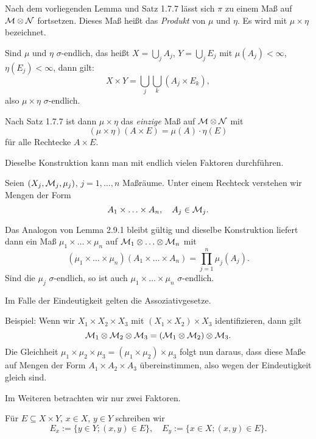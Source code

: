 \begin{defn}
 Nach dem vorliegenden Lemma und Satz 1.7.7 lässt sich $\pi$ zu einem Maß auf $\mathcal{M} \otimes \mathcal{N}$ fortsetzen. Dieses Maß heißt das \emph{Produkt} von $\mu$ und $\eta$. Es wird mit $\mu \times \eta$ bezeichnet.
\end{defn}

\begin{rmrk}
 Sind $\mu$ und $\eta$ $\sigma$-endlich, das heißt $X = \bigcup_j A_j$, $Y = \bigcup_j E_j$ mit $\mu(A_j) < \infty$, $\eta(E_j) < \infty$, dann gilt:
 \[ X \times Y = \bigcup_j \bigcup_k (A_j \times E_k), \]
 also $\mu \times \eta$ $\sigma$-endlich.
 
 Nach Satz 1.7.7 ist dann $\mu \times \eta$ das \emph{einzige} Maß auf $\mathcal{M} \otimes \mathcal{N}$ mit 
 \[ (\mu \times \eta)(A \times E) = \mu(A) \cdot \eta(E) \]
 für alle Rechtecke $A \times E$.
\end{rmrk}

\begin{rmrk}
 Dieselbe Konstruktion kann man mit endlich vielen Faktoren durch\-führen.
 
 Seien $(X_j, \mathcal{M}_j, \mu_j)$, $j = 1, \ldots, n$ Maßräume. Unter einem Rechteck verstehen wir Mengen der Form
 \[ A_1 \times \ldots \times A_n, \quad A_j \in \mathcal{M}_j. \]
 
 Das Analogon von Lemma 2.9.1 bleibt gültig und dieselbe Konstruktion liefert dann ein Maß $\mu_1 \times \ldots \times \mu_n$ auf $\mathcal{M}_1 \otimes \ldots \otimes \mathcal{M}_n$ mit
 \[ (\mu_1 \times \ldots \times \mu_n)( A_1 \times \ldots \times A_n ) = \prod_{j=1}^n \mu_j(A_j). \]
 Sind die $\mu_j$ $\sigma$-endlich, so ist auch $\mu_1 \times \ldots \times \mu_n$ $\sigma$-endlich.
 
 Im Falle der Eindeutigkeit gelten die Assoziativgesetze. 
 
 Beispiel: Wenn wir $X_1 \times X_2 \times X_3$ mit $(X_1 \times X_2) \times X_3$ identifizieren, dann gilt
 \[ \mathcal{M}_1 \otimes \mathcal{M}_2 \otimes \mathcal{M}_3 = (\mathcal{M}_1 \otimes \mathcal{M}_2) \otimes \mathcal{M}_3. \]
 Die Gleichheit $\mu_1 \times \mu_2 \times \mu_3 = ( \mu_1 \times \mu_2 ) \times \mu_3$ folgt nun daraus, dass diese Maße auf Mengen der Form $A_1 \times A_2 \times A_3$ übereinstimmen, also wegen der Eindeutigkeit gleich sind.
\end{rmrk}

Im Weiteren betrachten wir nur zwei Faktoren.

Für $E \subseteq X \times Y$, $x \in X$, $y \in Y$ schreiben wir
\[ E_x := \{ y \in Y; (x,y) \in E \}, \quad E_y := \{ x \in X; (x,y) \in E \}. \]


